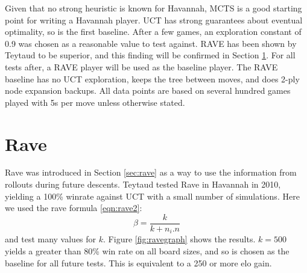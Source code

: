 



Given that no strong heuristic is known for Havannah, MCTS is a good starting point for writing a Havannah player. UCT has strong guarantees about eventual optimality, so is the first baseline. After a few games, an exploration constant of 0.9 was chosen as a reasonable value to test against. RAVE has been shown by Teytaud to be superior, and this finding will be confirmed in Section \ref{sec:playingrave}. For all tests after, a RAVE player will be used as the baseline player. The RAVE baseline has no UCT exploration, keeps the tree between moves, and does 2-ply node expansion backups. All data points are based on several hundred games played with 5s per move unless otherwise stated.


\section{Rave}\label{sec:playingrave}

Rave was introduced in Section \ref{sec:rave} as a way to use the information from rollouts during future descents. Teytaud tested Rave in Havannah in 2010\cite{teytaud2010creating}, yielding a 100\% winrate against UCT with a small number of simulations. Here we used the rave formula \eqref{eqn:rave2}: $$ \beta = \frac{k}{k+n_i.n}$$ and test many values for $k$. Figure \ref{fig:ravegraph} shows the results. $k=500$ yields a greater than 80\% win rate on all board sizes, and so is chosen as the baseline for all future tests. This is equivalent to a 250 or more elo gain.

